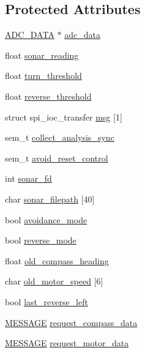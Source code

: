 \subsection*{Protected Attributes}
\begin{DoxyCompactItemize}
\item 
\hyperlink{SUBSYS__COMMANDS_8h_a0be7f6e3de248ca3bdb1f3f5a0819c62}{A\-D\-C\-\_\-\-D\-A\-T\-A} $\ast$ \hyperlink{classSonar_a9e2ea95994eefd09ec7546853ebf1cb7}{adc\-\_\-data}
\item 
float \hyperlink{classSonar_abd3f8ccfc42cacd700df9be06f70c6b2}{sonar\-\_\-reading}
\item 
float \hyperlink{classSonar_a83151cbccbce08be16dfec04a53f3295}{turn\-\_\-threshold}
\item 
float \hyperlink{classSonar_a27714390fb769905062ae587d8b2f112}{reverse\-\_\-threshold}
\item 
struct spi\-\_\-ioc\-\_\-transfer \hyperlink{classSonar_a29863f7d681d8119c233aa11398f65b7}{msg} \mbox{[}1\mbox{]}
\item 
sem\-\_\-t \hyperlink{classSonar_a3dcf7c38af34539c68f123f073eb2f52}{collect\-\_\-analysis\-\_\-sync}
\item 
sem\-\_\-t \hyperlink{classSonar_a6e842fc3ef4088c987a7a348df3b75ce}{avoid\-\_\-reset\-\_\-control}
\item 
int \hyperlink{classSonar_a4799c8b328d7735f7e6d62d741340c6c}{sonar\-\_\-fd}
\item 
char \hyperlink{classSonar_a7db9106da9a50d06b5f25c35f799abe5}{sonar\-\_\-filepath} \mbox{[}40\mbox{]}
\item 
bool \hyperlink{classSonar_a72b11a8e569125119750ee9dd094141b}{avoidance\-\_\-mode}
\item 
bool \hyperlink{classSonar_ad9f288f52d8d26a687a557c714d6f026}{reverse\-\_\-mode}
\item 
float \hyperlink{classSonar_a223e1294a7e00208efcd2a80f57e7620}{old\-\_\-compass\-\_\-heading}
\item 
char \hyperlink{classSonar_a3ee55a9a946c5c00a68b3774c316728e}{old\-\_\-motor\-\_\-speed} \mbox{[}6\mbox{]}
\item 
bool \hyperlink{classSonar_ad51a4f80202f692e4630f74490b5ef5d}{last\-\_\-reverse\-\_\-left}
\item 
\hyperlink{SUBSYS__COMMANDS_8h_ad814416fc1a8c675bea2687d96088a8f}{M\-E\-S\-S\-A\-G\-E} \hyperlink{classSonar_a560057581920d76e557880135548ce46}{request\-\_\-compass\-\_\-data}
\item 
\hyperlink{SUBSYS__COMMANDS_8h_ad814416fc1a8c675bea2687d96088a8f}{M\-E\-S\-S\-A\-G\-E} \hyperlink{classSonar_a5326194659d6f29efa21b6eae03f6a4e}{request\-\_\-motor\-\_\-data}

\end{DoxyCompactItemize}
